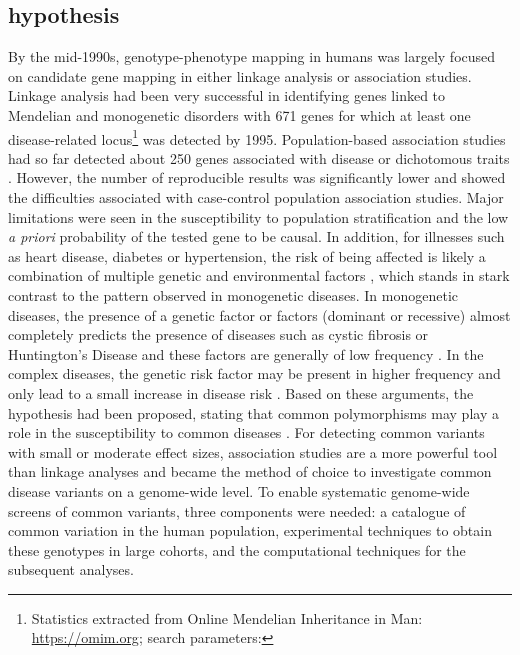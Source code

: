 \subsection{ hypothesis}
By the mid-1990s, genotype-phenotype mapping in humans was largely focused on candidate gene mapping in either linkage analysis or association studies. Linkage analysis had been very successful in identifying genes linked to Mendelian and monogenetic disorders with \num{671} genes for which at least one disease-related locus\footnote{Statistics extracted from Online Mendelian Inheritance in Man: \url{https://omim.org}; search parameters: } was detected by 1995. Population-based association studies had so far detected about 250 genes associated with disease or dichotomous traits \citep{Hirschhorn2002}. However, the number of reproducible results was significantly lower and showed the difficulties associated with case-control population association studies. Major limitations were seen in the susceptibility to population stratification \citep{Lohmueller2003} and the low \textit{a priori} probability of the tested gene to be causal. In addition, for illnesses such as heart disease, diabetes or hypertension, the risk of being affected is likely a combination of multiple genetic and environmental factors \citep{Hunter2005}, which stands in stark contrast to the pattern observed in monogenetic diseases. In monogenetic diseases, the presence of a genetic factor or factors (dominant or recessive) almost completely predicts the presence of diseases such as cystic fibrosis or Huntington's Disease and these factors are generally of low frequency \citep{Sankaranarayanan1998}.  In the complex diseases, the genetic risk factor may be present in higher frequency and only lead to a small increase in disease risk \citep{Reich2001}. Based on these arguments, the  hypothesis had been proposed, stating that common polymorphisms may play a role in the susceptibility to common diseases \citep{Risch1996,Lander1996,Chakravarti1999,Reich2001}. For detecting common variants with small or moderate effect sizes, association studies are a more powerful tool than linkage analyses \citep{Ott2015} and became the method of choice to investigate common disease variants on a genome-wide level. To enable systematic genome-wide screens of common variants, three components were needed: a catalogue of common variation in the human population, experimental techniques to obtain these genotypes in large cohorts, and the computational techniques for the subsequent analyses. 

